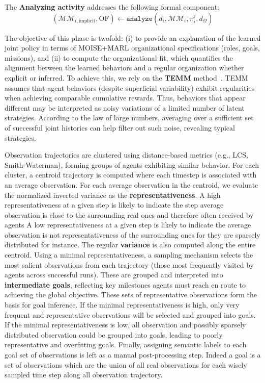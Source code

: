 \documentclass[pdflatex,sn-mathphys-num]{sn-jnl}%
\theoremstyle{thmstyleone}%
\theoremstyle{thmstyletwo}%
\theoremstyle{thmstylethree}%
\begin{document}
\noindent The \textbf{Analyzing activity} addresses the following formal component:
\[
    (\mathcal{MM}_{i,\text{implicit}}, \text{OF}) \gets \texttt{analyze}(d_i, \mathcal{MM}_i, \pi^j_i, d_\Omega)
\]

\noindent The objective of this phase is twofold: (i) to provide an explanation of the learned joint policy in terms of MOISE+MARL organizational specifications (roles, goals, missions), and (ii) to compute the organizational fit, which quantifies the alignment between the learned behaviors and a regular organization whether explicit or inferred.
%
To achieve this, we rely on the \textbf{TEMM} method~\cite{soule2025moisemarl}. TEMM assumes that agent behaviors (despite superficial variability) exhibit regularities when achieving comparable cumulative rewards. Thus, behaviors that appear different may be interpreted as noisy variations of a limited number of latent strategies. According to the law of large numbers, averaging over a sufficient set of successful joint histories can help filter out such noise, revealing typical strategies.

Observation trajectories are clustered using distance-based metrics (e.g., LCS, Smith-Waterman), forming groups of agents exhibiting similar behavior. For each cluster, a centroid trajectory is computed where each timestep is associated with an average observation. For each average observation in the centroid, we evaluate the normalized inverted variance as the \textbf{representativeness}. A high representativeness at a given step is likely to indicate the step average observation is close to the surrounding real ones and therefore often received by agents A low representativeness at a given step is likely to indicate the average observation is not representativeness of the surrounding ones for they are sparsely distributed for instance. The regular \textbf{variance} is also computed along the entire centroid.
%
Using a minimal representativeness, a sampling mechanism selects the most salient observations from each trajectory (those most frequently visited by agents across successful runs). These are grouped and interpreted into \textbf{intermediate goals}, reflecting key milestones agents must reach en route to achieving the global objective. These sets of representative observations form the basis for goal inference. If the minimal representativeness is high, only very frequent and representative observations will be selected and grouped into goals. If the minimal representativeness is low, all observation and possibly sparsely distributed observation could be grouped into goals, leading to poorly representative and overfitting goals. Finally, assigning semantic labels to each goal set of observations is left as a manual post-processing step. Indeed a goal is a set of observations which are the union of all real observations for each wisely sampled time step along all observation trajectory.
\end{document}
